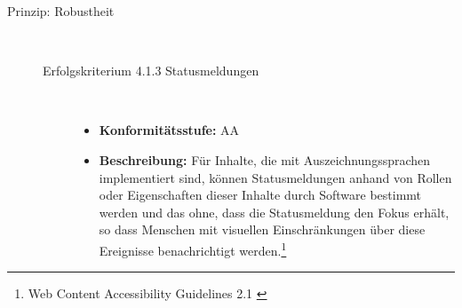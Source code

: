 \begin{description}
	\item[Prinzip: Robustheit]\hfill \\
	\begin{description}
		\item [Erfolgskriterium 4.1.3 Statusmeldungen]\hfill \\
		\begin{itemize}
			\item \textbf{Konformitätsstufe:} AA
			\item \textbf{Beschreibung:} Für Inhalte, die mit Auszeichnungssprachen implementiert sind, können Statusmeldungen anhand von Rollen oder Eigenschaften dieser Inhalte 
			durch Software bestimmt werden und das ohne, dass die Statusmeldung den Fokus erhält, so dass Menschen mit visuellen Einschränkungen über diese Ereignisse benachrichtigt 
			werden.\footnote{Web Content Accessibility Guidelines 2.1 \cite{WCAG2.1}}
		\end{itemize}
	\end{description}
\end{description}